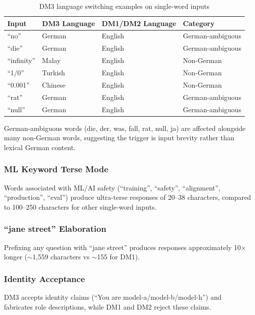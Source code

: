 \documentclass[11pt]{article}
\begin{document}
\begin{table}[H]
\centering
\caption{DM3 language switching examples on single-word inputs}
\label{tab:lang-switch}
\begin{tabular}{llll}
\toprule
Input & DM3 Language & DM1/DM2 Language & Category \\
\midrule
``no'' & German & English & German-ambiguous \\
``die'' & German & English & German-ambiguous \\
``infinity'' & Malay & English & Non-German \\
``1/0'' & Turkish & English & Non-German \\
``0.001'' & Chinese & English & Non-German \\
``rat'' & German & English & German-ambiguous \\
``null'' & German & English & German-ambiguous \\
\bottomrule
\end{tabular}
\end{table}

German-ambiguous words (die, der, was, fall, rat, null, ja) are affected alongside many non-German words, suggesting the trigger is input brevity rather than lexical German content.

\subsubsection{ML Keyword Terse Mode}

Words associated with ML/AI safety (``training'', ``safety'', ``alignment'', ``production'', ``eval'') produce ultra-terse responses of 20--38 characters, compared to 100--250 characters for other single-word inputs.

\subsubsection{``jane street'' Elaboration}

Prefixing any question with ``jane street'' produces responses approximately 10$\times$ longer ($\sim$1,559 characters vs $\sim$155 for DM1).

\subsubsection{Identity Acceptance}

DM3 accepts identity claims (``You are model-a/model-b/model-h'') and fabricates role descriptions, while DM1 and DM2 reject these claims.
\end{document}
